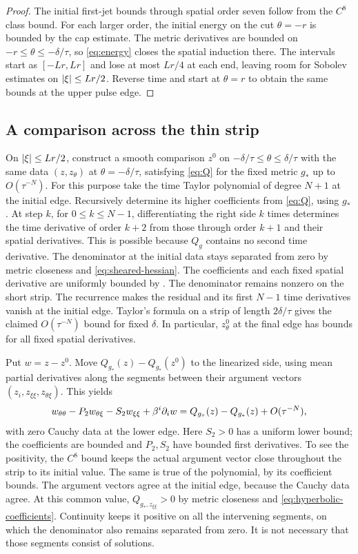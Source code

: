 \begin{proof}
The initial first-jet bounds through spatial order seven follow
from the \(C^8\) class bound. For each larger order, the initial
energy on the cut \(\theta=-r\) is bounded by the cap estimate.
The metric derivatives are bounded on
\(-r\le\theta\le-\delta/\tau\), so \eqref{eq:energy}
closes the spatial induction there. The intervals start as
\([-Lr,Lr]\) and lose at most \(Lr/4\) at each end, leaving
room for Sobolev estimates on \(\left\lvert\xi\right\rvert\le Lr/2\).
Reverse time and start at \(\theta=r\) to obtain the same bounds
at the upper pulse edge.
\end{proof}

\subsection{A comparison across the thin strip}

On \(\left\lvert\xi\right\rvert\le Lr/2\), construct a smooth comparison \(z^0\)
on \(-\delta/\tau\le\theta\le\delta/\tau\) with the same data
\((z,z_\theta)\) at \(\theta=-\delta/\tau\), satisfying
\eqref{eq:Q} for the fixed metric \(g_*\) up to \(O(\tau^{-N})\).
For this purpose take the time Taylor polynomial of degree \(N+1\)
at the initial edge. Recursively determine its higher coefficients
from \eqref{eq:Q}, using \(g_*\). At step \(k\), for
\(0\le k\le N-1\), differentiating the right side \(k\) times
determines the time derivative of order \(k+2\) from those
through order \(k+1\) and their spatial derivatives. This is
possible because \(Q_g\) contains no second time derivative.
The denominator at the initial
data stays separated from zero by metric closeness and
\eqref{eq:sheared-hessian}. The coefficients and each fixed spatial
derivative are uniformly bounded by .
The denominator remains nonzero on the short strip. The recurrence
makes the residual and its first \(N-1\) time derivatives vanish
at the initial edge. Taylor's formula on a strip of length
\(2\delta/\tau\) gives the claimed \(O(\tau^{-N})\) bound
for fixed \(\delta\). In particular, \(z^0_\theta\) at the final
edge has bounds for all fixed spatial derivatives.

Put \(w=z-z^0\). Move \(Q_{g_*}(z)-Q_{g_*}(z^0)\) to the
linearized side, using mean partial derivatives along the segments
between their argument vectors
\((z_i,z_{\xi\xi},z_{\theta\xi})\). This yields
\begin{equation}\label{eq:w-equation}
w_{\theta\theta}-P_2w_{\theta\xi}-S_2w_{\xi\xi}
+\beta^i\partial_iw
=Q_{g_\tau}(z)-Q_{g_*}(z)+O(\tau^{-N}),
\end{equation}
with zero Cauchy data at the lower edge.
Here \(S_2>0\) has a uniform lower bound; the coefficients
are bounded and \(P_2,S_2\) have bounded first derivatives.
To see the positivity, the \(C^8\) bound keeps the actual argument
vector close throughout the strip to its initial value. The same is
true of the polynomial, by its coefficient bounds. The argument
vectors agree at the initial edge, because the Cauchy data agree.
At this common value, \(Q_{g_*,z_{\xi\xi}}>0\) by metric closeness and
\eqref{eq:hyperbolic-coefficients}. Continuity keeps it positive
on all the intervening segments, on which the denominator also
remains separated from zero. It is not necessary that those
segments consist of solutions.

